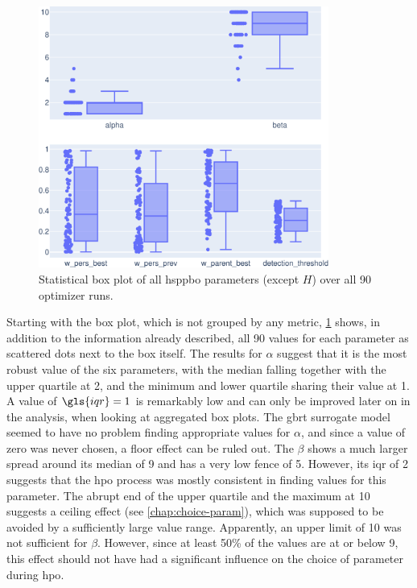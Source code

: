 \begin{figure}[h]
	\centering
	\includegraphics[width=0.85\textwidth]{results/part2/parameter_boxplot_None.svg}
	\caption[Statistical box plot of \gls{hsppbo} parameters]{Statistical box plot of all \gls{hsppbo} parameters (except $H$) over all 90 optimizer runs.}
	\label{fig:parameter_boxplot}
\end{figure}

Starting with the box plot, which is not grouped by any metric, \cref{fig:parameter_boxplot} shows, in addition to the information already described, all 90 values for each parameter as scattered dots next to the box itself. The results for $\alpha$ suggest that it is the most robust value of the six parameters, with the median falling together with the upper quartile at 2, and the minimum and lower quartile sharing their value at 1. A value of $\gls{iqr} = 1$ is remarkably low and can only be improved later on in the analysis, when looking at aggregated box plots. The \gls{gbrt} surrogate model seemed to have no problem finding appropriate values for $\alpha$, and since a value of zero was never chosen, a floor effect can be ruled out. The $\beta$ shows a much larger spread around its median of 9 and has a very low fence of 5. However, its \gls{iqr} of 2 suggests that the \gls{hpo} process was mostly consistent in finding values for this parameter. The abrupt end of the upper quartile and the maximum at 10 suggests a ceiling effect (see \cref{chap:choice-param}), which was supposed to be avoided by a sufficiently large value range. Apparently, an upper limit of 10 was not sufficient for $\beta$. However, since at least 50\% of the values are at or below 9, this effect should not have had a significant influence on the choice of parameter during \glsdesc{hpo}. 

